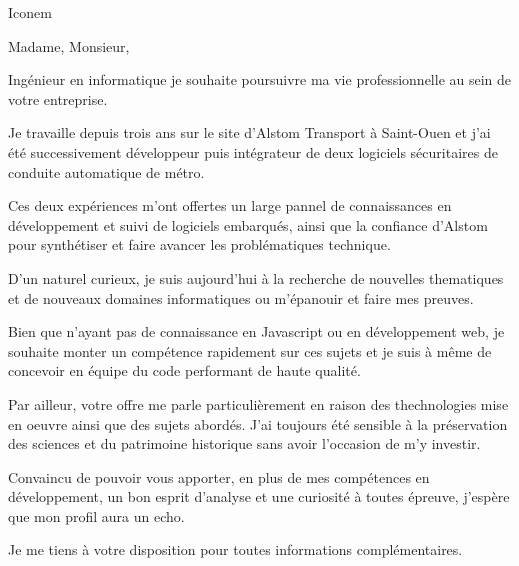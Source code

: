 \documentclass[12pt]{lettre}
\makeatletter
\newcommand*{\NoRule}{\renewcommand*{\rule@length}{0}}
\makeatother
\begin{document}
\begin{letter}{Iconem}

  \def\concname{Objet :~}


  \signature{Hoel IRIS}
  \address{Hoel IRIS\\
  54 avenue Mathurin Moreau\\
  75019 Paris\\
  Tel : 06 18 39 30 11\\
  E-Mail : hoel.iris@gmail.com}
  \NoRule
  \notelephone
  \nofax
    \opening{Madame, Monsieur,}


    Ingénieur en informatique je souhaite poursuivre ma vie professionnelle au sein de votre entreprise.

    Je travaille depuis trois ans sur le site d'Alstom Transport à Saint-Ouen et j'ai été successivement développeur puis intégrateur de deux logiciels sécuritaires de conduite automatique de métro.

    Ces deux expériences m'ont offertes un large pannel de connaissances en développement et suivi de logiciels embarqués, ainsi que la confiance d'Alstom pour synthétiser et faire avancer les problématiques technique.

    D'un naturel curieux, je suis aujourd'hui à la recherche de nouvelles thematiques et de nouveaux domaines informatiques ou m'épanouir et faire mes preuves.
    
    Bien que n'ayant pas de connaissance en Javascript ou en développement web, je souhaite monter un compétence rapidement sur ces sujets et je suis à même de concevoir en équipe du code performant de haute qualité. 
    
    Par ailleur, votre offre me parle particulièrement en raison des thechnologies mise en oeuvre ainsi que des sujets abordés. J'ai toujours été sensible à la préservation des sciences et du patrimoine historique sans avoir l'occasion de m'y investir.
    
    Convaincu de pouvoir vous apporter, en plus de mes compétences en développement, un bon esprit d'analyse et une curiosité à toutes épreuve, j'espère que mon profil aura un echo.
        
    Je me tiens à votre disposition pour toutes informations complémentaires.
 
 
 
 


\end{letter}
\end{document}
